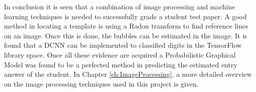 In conclusion it is seen that a combination of image processing and machine learning techniques is needed to successfully grade a student test paper. A good method in locating a template is using a Radon transform to find reference lines on an image. Once this is done, the bubbles can be estimated in the image. It is found that a DCNN can be implemented to classified digits in the TensorFlow library space. Once all these evidence are acquired a Probabilistic Graphical Model was found to be a perfected method in predicting the estimated entry answer of the student.
In Chapter \ref{ch:ImageProcessing}, a more detailed overview on the image processing techniques used in this project is given.
